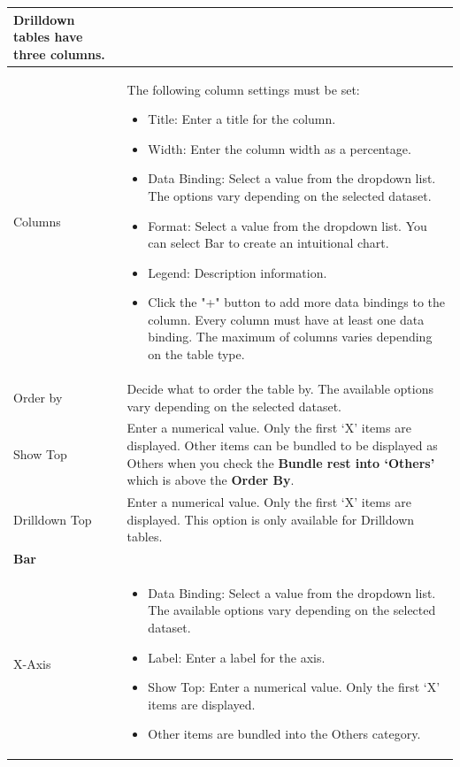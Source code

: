\begin{description}
\begin{longtable}{p{}|p{}}
        
                    Drilldown tables have three columns.\\\hline 
        Columns & The following column settings must be set:


                    \begin{itemize}
                        \item Title: Enter a title for the column.
                        \item Width: Enter the column width as a percentage.
                        \item Data Binding: Select a value from the dropdown list. The options vary depending on the selected dataset.
                        \item Format: Select a value from the dropdown list. You can select Bar to create an intuitional chart.
                        \item Legend: Description information.
                        \item Click the "+" button to add more data bindings to the column. Every column must have at least one data binding. The maximum of columns varies depending on the table type.
                    \end{itemize} \\\hline 
        Order by & Decide what to order the table by. The available options vary depending on the selected dataset. \\\hline 
        Show Top & Enter a numerical value. Only the first ‘X’ items are displayed. 
                   Other items can be bundled to be displayed as Others when you check the \textbf{Bundle rest into ‘Others’} which is above the \textbf{Order By}. \\\hline 
        Drilldown Top & Enter a numerical value. Only the first ‘X’ items are displayed. This option is only available for Drilldown tables.\\\hline 
        \multicolumn{2}{l}{\textbf{Bar}}\\\hline
        X-Axis & \begin{itemize}
                    \item Data Binding: Select a value from the dropdown list. The available options vary depending on the selected dataset.
                    \item Label: Enter a label for the axis.
                    \item Show Top: Enter a numerical value. Only the first ‘X’ items are displayed.
                    \item Other items are bundled into the Others category.

\end{itemize}
\end{longtable}
\end{description}
